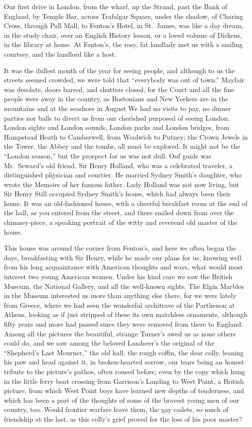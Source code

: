\documentclass[12pt]{book}
\begin{document}
Our first drive in London, from the wharf, up the Strand, past the Bank of
England, by Temple Bar, across Trafalgar Square, under the shadow, of Charing
Cross, through Pall Mall, to Fenton’s Hotel, in St.~James, was like a day dream,
in the study chair, over an English History lesson, or a loved volume of Dickens,
in the library at home. At Fenton’s, the rosy, fat landlady met us with a smiling
courtesy, and the landlord like a host.

It was the dullest month of the year for seeing people, and although to us
the streets seemed crowded, we were told that “everybody was out of town.”
Mayfair was desolate, doors barred, and shutters closed, for the Court and all
the fine people were away in the country, as Bostonians and New Yorkers are in
the mountains and at the seashore in August We had no visits to pay, no dinner
parties nor balls to divert us from our cherished purposed of seeing London.
London sights and London sounds, London parks and London bridges, from
Hampstead Heath to Camberwell, from Woolwich to Putney; the Crown Jewels
in the Tower, the Abbey and the tombs, all must be explored. It might not be the
“London season,” but the prospect for us was not dull. Ouf guide was Mr.~Seward’s
old friend. Sir Henry Holland, who was a celebrated traveler, a distinguished
physician and courtier. He married Sydney Smith’s daughter, who wrote the
Memoirs of her famous father. Lady Holland was not now living, but Sir Henry
Still occupied Sydney Smith’s house, which had always been their home. It was
an old‐fashioned house, with a cheerful breakfast room at the end of the hall, as
you entered from the street, and there smiled down from over the chimney‐piece,
a speaking portrait of the witty and reverend old master of the house.

This house was around the corner from Fenton’s, and here we often began the
days, breakfasting with Sir Henry, while he made our plans for us, knowing well
from his long acquaintance with American thoughts and ways, what would most
interest two young American women. Under his kind care we saw the British
Museum, the National Gallery, and all the well‐known sights. The Elgin Marbles
in the Museum interested us more than anything else there, for we were lately
from Greece, where we had seen the wonderful architrave of the Parthenon at
Athens, looking as if just stripped of these its own matchless ornaments, although
fifty years and more had passed since they were removed from there to England.
Among all the pictures the beautiful, strange Turner’s awed us as none others
could do, and we saw among the beloved Landseer’s the original of the “Shepherd’s
Last Mourner,” the old hall, the rough coffin, the dear colly, leaning his paw and
head against it, in broken‐hearted sorrow, our tears being an honest tribute to the
picture’s pathos, often roused before, even by the copy which hung in the little
ferry boat crossing from Garrison’s Landing to West Point, a British picture, from
which West Point boys have learned new depths of tenderness, and which has
been a part of the thoughts of some of the bravest young men of our country, too.
Would frontier warfare leave them, the gay cadets, so much of friendship at the
last, as this colly’s grief proved for the loss of his poor master?
\end{document}
